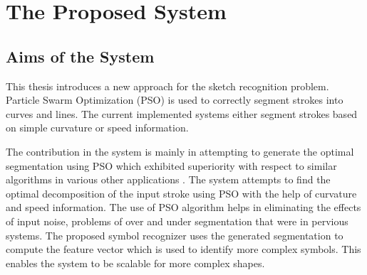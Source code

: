 \chapter{The Proposed System}
\label{sec:proposedSystem}
\section{Aims of the System}
\label{sec:AimsOfTheSystem}
This thesis introduces a new approach for the sketch recognition problem. Particle Swarm Optimization (PSO) is used to correctly segment strokes into curves and lines. The current implemented systems either segment strokes based on simple curvature\cite{meanshift10,earlySketchbased4} or speed information\cite{earlySketchbased4}.


The contribution in the system is mainly in attempting to generate the optimal segmentation using PSO which exhibited superiority with respect to similar algorithms in various other applications \cite{PolygonApproximationPSO}. The system attempts to find the optimal decomposition of the input stroke using PSO with the help of curvature and speed information. The use of PSO algorithm helps in eliminating the effects of input noise, problems of over and under segmentation that were in pervious systems. The proposed symbol recognizer uses the generated segmentation to compute the feature vector which is used to identify more complex symbols. This enables the system to be scalable for more complex shapes.




